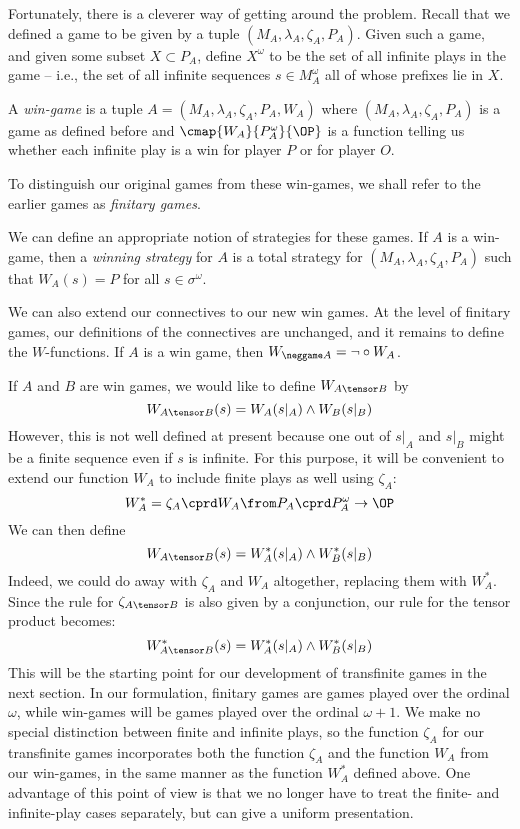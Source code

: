 \documentclass[11pt]{article} %
\begin{document}
Fortunately, there is a cleverer way of getting around the problem.  Recall that we defined a game to be given by a tuple $(M_A,\lambda_A,\zeta_A,P_A)$.  Given such a game, and given some subset $X\subset P_A$, define $X^\omega$ to be the set of all infinite plays in the game -- i.e., the set of all infinite sequences $s\in M_A^\omega$ all of whose prefixes lie in $X$.  

\begin{definition}
  A \emph{win-game} is a tuple $A=(M_A,\lambda_A,\zeta_A,P_A,W_A)$ where $(M_A,\lambda_A,\zeta_A,P_A)$ is a game as defined before and $\cmap{W_A}{P_A^\omega}{\OP}$ is a function telling us whether each infinite play is a win for player $P$ or for player $O$.  
\end{definition}

To distinguish our original games from these win-games, we shall refer to the earlier games as \emph{finitary games}.  

We can define an appropriate notion of strategies for these games.  If $A$ is a win-game, then a \emph{winning strategy} for $A$ is a total strategy for $(M_A,\lambda_A,\zeta_A,P_A)$ such that $W_A(s)=P$ for all $s\in\sigma^\omega$.  

We can also extend our connectives to our new win games.  At the level of finitary games, our definitions of the connectives are unchanged, and it remains to define the $W$-functions.  If $A$ is a win game, then $W_{\neggame A}=\neg\circ W_A$.  

If $A$ and $B$ are win games, we would like to define $W_{A\tensor B}$ by
\[
  W_{A\tensor B}(s) = W_A(s\vert_A) \wedge W_B(s\vert_B)
  \]
However, this is not well defined at present because one out of $s\vert_A$ and $s\vert_B$ might be a finite sequence even if $s$ is infinite.  For this purpose, it will be convenient to extend our function $W_A$ to include finite plays as well using $\zeta_A$:
\[
  W_A^* = \zeta_A\cprd W_A\from P_A\cprd P_A^\omega \to\OP
  \]
We can then define
\[
  W_{A\tensor B}(s) = W_A^*(s\vert_A)\wedge W_B^*(s\vert_B)
  \]
Indeed, we could do away with $\zeta_A$ and $W_A$ altogether, replacing them with $W_A^*$.  Since the rule for $\zeta_{A\tensor B}$ is also given by a conjunction, our rule for the tensor product becomes:
\[
  W_{A\tensor B}^*(s) = W_A^*(s\vert_A)\wedge W_B^*(s\vert_B)
  \]
This will be the starting point for our development of transfinite games in the next section.  In our formulation, finitary games are games played over the ordinal $\omega$, while win-games will be games played over the ordinal $\omega+1$.  We make no special distinction between finite and infinite plays, so the function $\zeta_A$ for our transfinite games incorporates both the function $\zeta_A$ and the function $W_A$ from our win-games, in the same manner as the function $W_A^*$ defined above.  One advantage of this point of view is that we no longer have to treat the finite- and infinite-play cases separately, but can give a uniform presentation.  
\end{document}
